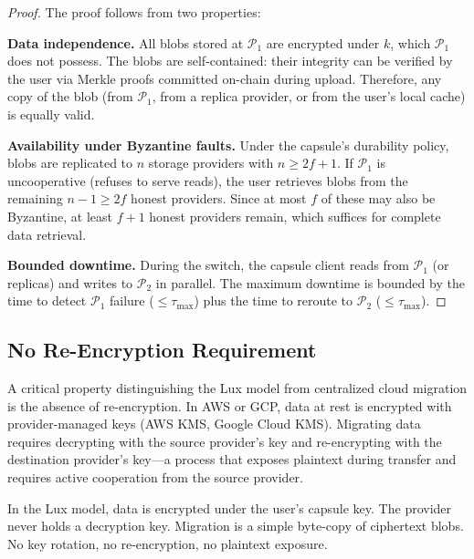 \begin{proof}
The proof follows from two properties:

\textbf{Data independence.} All blobs stored at $\mathcal{P}_1$ are
encrypted under $k$, which $\mathcal{P}_1$ does not possess. The blobs
are self-contained: their integrity can be verified by the user via
Merkle proofs committed on-chain during upload. Therefore, any copy of
the blob (from $\mathcal{P}_1$, from a replica provider, or from the
user's local cache) is equally valid.

\textbf{Availability under Byzantine faults.} Under the capsule's
durability policy, blobs are replicated to $n$ storage providers with
$n \geq 2f + 1$. If $\mathcal{P}_1$ is uncooperative (refuses to serve
reads), the user retrieves blobs from the remaining $n - 1 \geq 2f$
honest providers. Since at most $f$ of these may also be Byzantine, at
least $f + 1$ honest providers remain, which suffices for complete data
retrieval.

\textbf{Bounded downtime.} During the switch, the capsule client reads
from $\mathcal{P}_1$ (or replicas) and writes to $\mathcal{P}_2$ in
parallel. The maximum downtime is bounded by the time to detect
$\mathcal{P}_1$ failure ($\leq \tau_{\max}$) plus the time to reroute
to $\mathcal{P}_2$ ($\leq \tau_{\max}$).
\end{proof}

\subsection{No Re-Encryption Requirement}

A critical property distinguishing the Lux model from centralized cloud
migration is the absence of re-encryption. In AWS or GCP, data at rest
is encrypted with provider-managed keys (AWS KMS, Google Cloud KMS).
Migrating data requires decrypting with the source provider's key and
re-encrypting with the destination provider's key---a process that
exposes plaintext during transfer and requires active cooperation from
the source provider.

In the Lux model, data is encrypted under the user's capsule key. The
provider never holds a decryption key. Migration is a simple byte-copy
of ciphertext blobs. No key rotation, no re-encryption, no plaintext
exposure.

